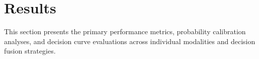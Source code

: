 \section{Results}
\label{sec:results}
This section presents the primary performance metrics, probability calibration analyses, and decision curve evaluations across individual modalities and decision fusion strategies.
